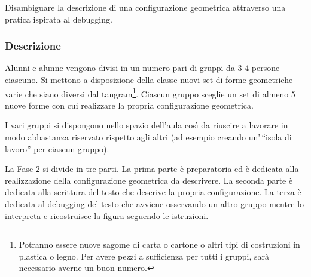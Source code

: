 Disambiguare la descrizione di una configurazione geometrica attraverso una pratica ispirata al debugging.

\subsubsection{Descrizione}

Alunni e alunne vengono divisi in un numero pari di gruppi da 3-4 persone ciascuno. Si mettono a disposizione della classe nuovi set di forme geometriche varie che siano diversi dal tangram\footnote{Potranno essere nuove sagome di carta o cartone o altri tipi di costruzioni in plastica o legno. Per avere pezzi a sufficienza per tutti i gruppi, sarà necessario averne un buon numero.}. Ciascun gruppo sceglie un set di almeno 5 nuove forme con cui realizzare la propria configurazione geometrica.

I vari gruppi si dispongono nello spazio dell'aula così da riuscire a lavorare in modo abbastanza riservato rispetto agli altri (ad esempio creando un'\,``isola di lavoro'' per ciascun gruppo).

La Fase 2 si divide in tre parti. La prima parte è preparatoria ed è dedicata alla realizzazione della configurazione geometrica da descrivere. La seconda parte è dedicata alla scrittura del testo che descrive la propria configurazione. La terza è dedicata al debugging del testo che avviene osservando un altro gruppo mentre lo interpreta e ricostruisce la figura seguendo le istruzioni.

